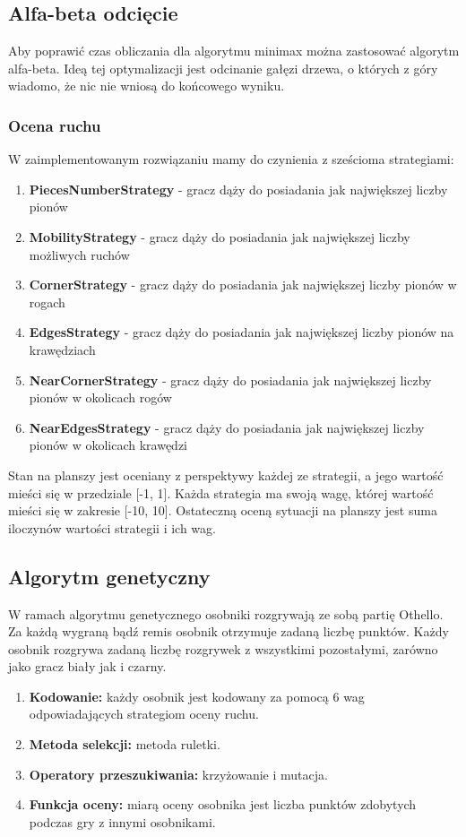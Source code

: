 \subsection{Alfa-beta odcięcie}
Aby poprawić czas obliczania dla algorytmu minimax można zastosować algorytm alfa-beta. Ideą tej optymalizacji jest odcinanie gałęzi drzewa, o których z góry wiadomo, że nic nie wniosą do końcowego wyniku.

\subsubsection{Ocena ruchu}
W zaimplementowanym rozwiązaniu mamy do czynienia z sześcioma strategiami:

\begin{enumerate}
 \item \textbf{PiecesNumberStrategy} - gracz dąży do posiadania jak największej liczby pionów
 \item \textbf{MobilityStrategy} - gracz dąży do posiadania jak największej liczby możliwych ruchów
 \item \textbf{CornerStrategy} - gracz dąży do posiadania jak największej liczby pionów w rogach
 \item \textbf{EdgesStrategy} - gracz dąży do posiadania jak największej liczby pionów na krawędziach
 \item \textbf{NearCornerStrategy} - gracz dąży do posiadania jak największej liczby pionów w okolicach rogów
 \item \textbf{NearEdgesStrategy} - gracz dąży do posiadania jak największej liczby pionów w okolicach krawędzi
\end{enumerate}

Stan na planszy jest oceniany z perspektywy każdej ze strategii, a jego wartość mieści się w przedziale [-1, 1]. Każda strategia ma swoją wagę, której wartość mieści się w zakresie [-10, 10]. Ostateczną oceną sytuacji na planszy jest suma iloczynów wartości strategii i ich wag.


\subsection{Algorytm genetyczny}
W ramach algorytmu genetycznego osobniki rozgrywają ze sobą partię Othello. Za każdą wygraną bądź remis osobnik otrzymuje zadaną liczbę punktów. Każdy osobnik rozgrywa zadaną liczbę rozgrywek z wszystkimi pozostałymi, zarówno jako gracz biały jak i czarny.

\begin{enumerate}
 \item \textbf{Kodowanie:} każdy osobnik jest kodowany za pomocą 6 wag odpowiadających strategiom oceny ruchu.
 \item \textbf{Metoda selekcji:} metoda ruletki.
 \item \textbf{Operatory przeszukiwania:} krzyżowanie i mutacja.
 \item \textbf{Funkcja oceny:} miarą oceny osobnika jest liczba punktów zdobytych podczas gry z innymi osobnikami.
\end{enumerate}
